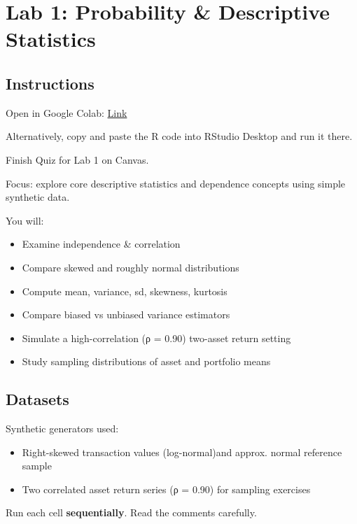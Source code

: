 \documentclass[
  12pt,
  letterpaper,
]{scrbook}
\providecommand{\tightlist}{%
  \setlength{\itemsep}{0pt}\setlength{\parskip}{0pt}}
\renewcommand{\tightlist}{\setlength{\itemsep}{0.5\baselineskip}\setlength{\parskip}{0.2\baselineskip}}
\theoremstyle{plain}
\theoremstyle{definition}
\theoremstyle{remark}
\begin{document}
\chapter{Lab 1: Probability \& Descriptive
Statistics}\label{lab-1-probability-descriptive-statistics}

\section{Instructions}\label{instructions}

Open in Google Colab:
\href{https://colab.research.google.com/drive/1JLABtp6OJUJHmODRHpQ9FQXovp73na_9?usp=share_link}{Link}

Alternatively, copy and paste the R code into RStudio Desktop and run it
there.

Finish Quiz for Lab 1 on Canvas.

Focus: explore core descriptive statistics and dependence concepts using
simple synthetic data.

You will:

\begin{itemize}
\tightlist
\item
  Examine independence \& correlation
\item
  Compare skewed and roughly normal distributions
\item
  Compute mean, variance, sd, skewness, kurtosis
\item
  Compare biased vs unbiased variance estimators
\item
  Simulate a high-correlation (ρ = 0.90) two-asset return setting
\item
  Study sampling distributions of asset and portfolio means
\end{itemize}

\section{Datasets}\label{datasets}

Synthetic generators used:

\begin{itemize}
\tightlist
\item
  Right-skewed transaction values (log-normal)and approx. normal
  reference sample
\item
  Two correlated asset return series (ρ = 0.90) for sampling exercises
\end{itemize}

Run each cell \textbf{sequentially}. Read the comments carefully.
\end{document}
